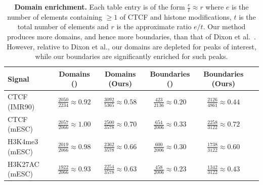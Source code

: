 \documentclass[12pt]{cmuthesis}
\begin{document}
  \begin{table}[b]
  \centering
  \caption{\textbf{Domain enrichment.} Each table entry is of the form $\frac{e}{t} \approx r$ where $e$ is the number of elements containing $\ge 1$ of CTCF and histone modifications, $t$ is the total number of elements and $r$ is the approximate ratio $e/t$.  Our method produces more domains,
  and hence more boundaries, than that of Dixon et al.~\cite{Dixon2012}.  However, relative to Dixon et al., our domains are depleted for peaks of interest, while our boundaries are significantly enriched
  for such peaks.}
  \label{tab:differentalEnrichment}
  \scriptsize
  \begin{tabular}{lc@{\hskip 15pt}c@{\hskip 5pt}|@{\hskip 5pt}c@{\hskip 15pt}c@{\hskip 15pt}c}
  \toprule
  Signal & Domains (\cite{Dixon2012}) & Domains (Ours) & Boundaries (\cite{Dixon2012}) & Boundaries (Ours) \\
  \midrule
  CTCF (IMR90)   & $\frac{2050}{2234}\approx0.92$ & $\frac{3092}{5365}\approx0.58$ & $\frac{423}{2136}\approx0.20$ & $\frac{2126}{4861}\approx0.44$ \\[0.5em]
  CTCF (mESC)    & $\frac{2057}{2066}\approx1.00$ & $\frac{2500}{3578}\approx0.70$ & $\frac{654}{2006}\approx0.33$ & $\frac{2258}{3122}\approx0.72$ \\[0.5em]
  H3K4me3 (mESC) & $\frac{2019}{2066}\approx0.98$ & $\frac{2362}{3578}\approx0.66$ & $\frac{600}{2006}\approx0.30$ & $\frac{1738}{3122}\approx0.60$ \\[0.5em]
  H3K27AC (mESC) & $\frac{1922}{2066}\approx0.93$ & $\frac{2254}{3578}\approx0.63$ & $\frac{458}{2006}\approx0.23$ & $\frac{1342}{3122}\approx0.43$ \\
  \bottomrule
  \end{tabular}
  \end{table}
\end{document}
